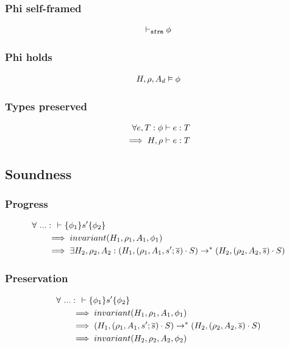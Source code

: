 \documentclass[11pt,a4paper]{article}
\begin{document}
\subsubsection{Phi self-framed}
\begin{align*}
    \vdash_\texttt{sfrm} {\phi}
\end{align*}

\subsubsection{Phi holds}
\begin{align*}
    H,\rho,A_d \vDash \phi
\end{align*}

\subsubsection{Types preserved}
\begin{align*}
    \forall e, T : \phi \vdash e : T& \\
    \implies H, \rho \vdash e : T&
\end{align*}

\subsection{Soundness}
\subsubsection{Progress}
\begin{align*}
\forall~ ... &:~~ \vdash\{\phi_1\}s'\{\phi_2\} 
\\ &\implies invariant(H_1, \rho_1, A_1, \phi_1)
\\ &\implies \exists H_2, \rho_2, A_2 : (H_1, (\rho_1, A_1, s' ; \overline{s}) \cdot S)
							\rightarrow^* (H_2, (\rho_2, A_2, \overline{s}) \cdot S)
\end{align*}

\subsubsection{Preservation}
\begin{align*}
\forall~ ... &:~~ \vdash\{\phi_1\}s'\{\phi_2\} 
\\ &\implies invariant(H_1, \rho_1, A_1, \phi_1)
\\ &\implies (H_1, (\rho_1, A_1, s' ; \overline{s}) \cdot S)
  \rightarrow^* (H_2, (\rho_2, A_2, \overline{s}) \cdot S)
\\ &\implies invariant(H_2, \rho_2, A_2, \phi_2)
\end{align*}
\end{document}
